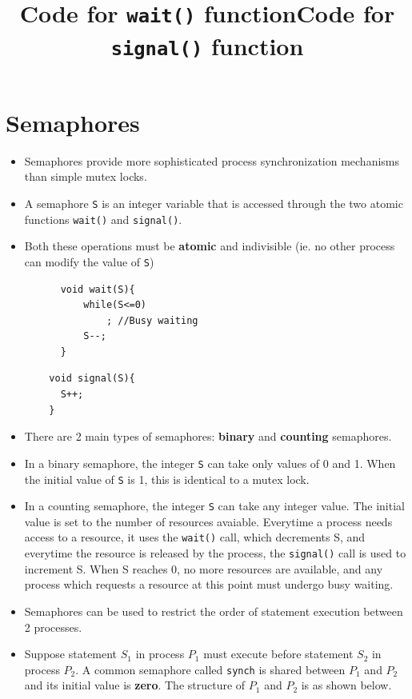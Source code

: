 \documentclass{article}
\theoremstyle{plain}
\theoremstyle{definition}
\begin{document}
\section{Semaphores}
\begin{itemize}
    \item Semaphores provide more sophisticated process synchronization mechanisms than simple mutex locks. 
    
    \item A semaphore \texttt{S} is an integer variable that is accessed through the two atomic functions \texttt{wait()} and \texttt{signal()}.
    
    \item Both these operations must be \textbf{atomic} and indivisible (ie. no other process can modify the value of \texttt{S})
\end{itemize}
\begin{figure}[!ht]
 \begin{minipage}{0.5\textwidth}
  \centering
  \begin{verbatim}
    void wait(S){
        while(S<=0)
            ; //Busy waiting
        S--;
    }
  \end{verbatim}
  \title{Code for \texttt{wait()} function}
 \end{minipage}
 \begin{minipage}{0.5\textwidth}
  \centering
  \begin{verbatim}
  void signal(S){
    S++;
  }
  \end{verbatim}
  \title{Code for \texttt{signal()} function}
 \end{minipage}
\end{figure}
\begin{itemize}
    \item There are 2 main types of semaphores: \textbf{binary} and \textbf{counting} semaphores.
    
    \item In a binary semaphore, the integer \texttt{S} can take only values of 0 and 1. When the initial value of \texttt{S} is 1, this is identical to a mutex lock.
    
    \item In a counting semaphore, the integer \texttt{S} can take any integer value. The initial value is set to the number of resources avaiable. Everytime a process needs access to a resource, it uses the \texttt{wait()} call, which decrements S, and everytime the resource is released by the process, the \texttt{signal()} call is used to increment S. When S reaches 0, no more resources are available, and any process which requests a resource at this point must undergo busy waiting. 
    
    \item Semaphores can be used to restrict the order of statement execution between 2 processes.
    
    \item Suppose statement $S_1$ in process $P_1$ must execute before statement $S_2$ in process $P_2$. A common semaphore called \texttt{synch} is shared between $P_1$ and $P_2$ and its initial value is \textbf{zero}. The structure of $P_1$ and $P_2$ is as shown below.
\end{itemize}
\end{document}
